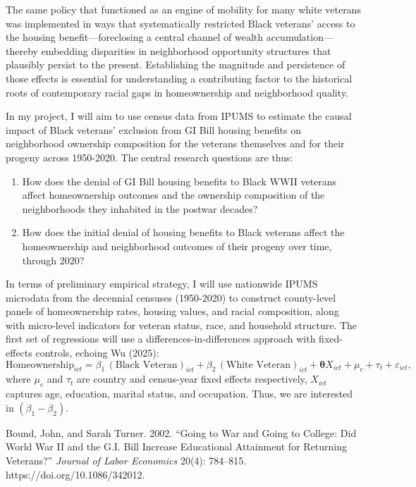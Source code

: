 \documentclass[11pt,answers]{exam}
\begin{document}
\begin{questions}
The same policy that functioned as an engine of mobility for many white veterans was implemented in ways that systematically restricted Black veterans' access to the housing benefit---foreclosing a central channel of wealth accumulation---thereby embedding disparities in neighborhood opportunity structures that plausibly persist to the present. Establishing the magnitude and persistence of those effects is essential for understanding a contributing factor to the historical roots of contemporary racial gaps in homeownership and  neighborhood quality.

In my project, I will aim to use census data from IPUMS to estimate the causal impact of Black veterans' exclusion from GI Bill housing benefits on neighborhood ownership composition for the veterans themselves and for their progeny across 1950-2020. The central research questions are thus:

\begin{enumerate}
	\item How does the denial of GI Bill housing benefits to Black WWII veterans affect homeownership outcomes and the ownership composition of the neighborhoods they inhabited in the postwar decades?
	\item How does the initial denial of housing benefits to Black veterans affect the homeownership and neighborhood outcomes of their progeny over time, through 2020?
\end{enumerate}

In terms of preliminary empirical strategy, I will use nationwide IPUMS microdata from the decennial censuses (1950-2020) to construct county-level panels of homeownership rates, housing values, and racial composition, along with micro-level indicators for veteran status, race, and household structure. The first set of regressions will use a differences-in-differences approach with fixed-effects controls, echoing Wu (2025):
\[
\text{Homeownership}_{ict}
= \beta_1\,(\text{Black Veteran})_{ict} + \beta_2\,(\text{White Veteran})_{ict} + \mathbf{\theta}X_{ict} + \mu_c + \tau_t + \varepsilon_{ict},
\]
where $\mu_c$ and $\tau_t$ are country and census-year fixed effects respectively, $X_{ict}$ captures age, education, marital status, and occupation. Thus, we are interested in $(\beta_1-\beta_2)$.

\begin{thebibliography}{99}

Bound, John, and Sarah Turner. 2002. ``Going to War and Going to College: Did World War II and the G.I. Bill Increase Educational Attainment for Returning Veterans?'' \textit{Journal of Labor Economics} 20(4): 784--815. https://doi.org/10.1086/342012.


\end{thebibliography}
\end{questions}
\end{document}
